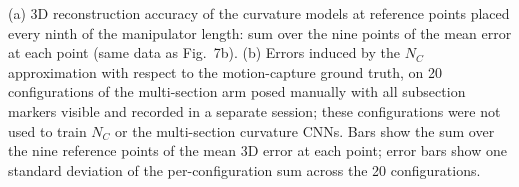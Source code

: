 \caption{(a) 3D reconstruction accuracy of the curvature models at reference points placed every ninth of the manipulator length: sum over the nine points of the mean error at each point (same data as Fig.~7b). (b) Errors induced by the $N_C$ approximation with respect to the motion-capture ground truth, on 20 configurations of the multi-section arm posed manually with all subsection markers visible and recorded in a separate session; these configurations were not used to train $N_C$ or the multi-section curvature CNNs. Bars show the sum over the nine reference points of the mean 3D error at each point; error bars show one standard deviation of the per-configuration sum across the 20 configurations.}
